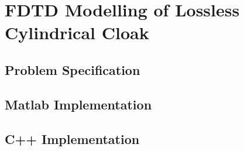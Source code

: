 \chapter{FDTD Modelling of Lossless Cylindrical Cloak}
\section{Problem Specification}
\section{Matlab Implementation}
\section{C++ Implementation}
